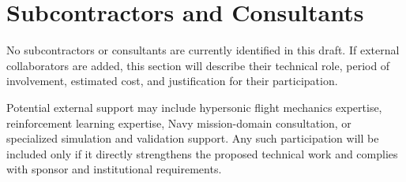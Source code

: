 \section{Subcontractors and Consultants}

No subcontractors or consultants are currently identified in this draft. If external collaborators are added, this section will describe their technical role, period of involvement, estimated cost, and justification for their participation.

Potential external support may include hypersonic flight mechanics expertise, reinforcement learning expertise, Navy mission-domain consultation, or specialized simulation and validation support. Any such participation will be included only if it directly strengthens the proposed technical work and complies with sponsor and institutional requirements.
